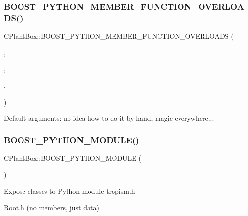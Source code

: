 \subsubsection{\texorpdfstring{B\+O\+O\+S\+T\+\_\+\+P\+Y\+T\+H\+O\+N\+\_\+\+M\+E\+M\+B\+E\+R\+\_\+\+F\+U\+N\+C\+T\+I\+O\+N\+\_\+\+O\+V\+E\+R\+L\+O\+A\+D\+S()}{BOOST\_PYTHON\_MEMBER\_FUNCTION\_OVERLOADS()}}
{\footnotesize\ttfamily C\+Plant\+Box\+::\+B\+O\+O\+S\+T\+\_\+\+P\+Y\+T\+H\+O\+N\+\_\+\+M\+E\+M\+B\+E\+R\+\_\+\+F\+U\+N\+C\+T\+I\+O\+N\+\_\+\+O\+V\+E\+R\+L\+O\+A\+DS (\begin{DoxyParamCaption}\item[{initialize\+\_\+overloads}]{,  }\item[{initialize}]{,  }\item[{0}]{,  }\item[{2}]{ }\end{DoxyParamCaption})}

Default arguments\+: no idea how to do it by hand, magic everywhere... \mbox{\label{namespaceCPlantBox_ac513e5a3c7d45d7293dc9d009901bd32}} 
\subsubsection{\texorpdfstring{B\+O\+O\+S\+T\+\_\+\+P\+Y\+T\+H\+O\+N\+\_\+\+M\+O\+D\+U\+L\+E()}{BOOST\_PYTHON\_MODULE()}}
{\footnotesize\ttfamily C\+Plant\+Box\+::\+B\+O\+O\+S\+T\+\_\+\+P\+Y\+T\+H\+O\+N\+\_\+\+M\+O\+D\+U\+LE (\begin{DoxyParamCaption}\item[{py\+\_\+plantbox}]{ }\end{DoxyParamCaption})}

Expose classes to Python module tropism.\+h

\hyperlink{Root_8h_source}{Root.\+h} (no members, just data)